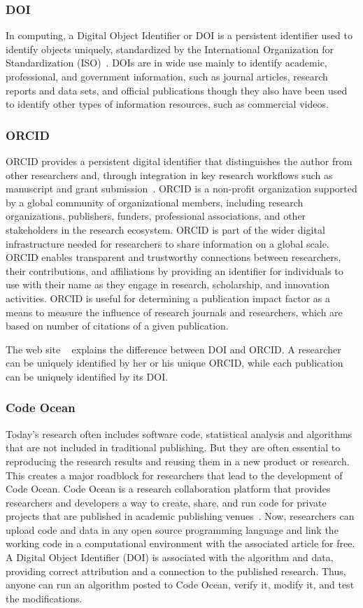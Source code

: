\subsubsection{DOI}
In computing, a Digital Object Identifier or DOI is a persistent identifier used to identify objects uniquely, standardized by the International Organization for Standardization (ISO)~\cite{ISO26324}.  DOIs are in wide use mainly to identify academic, professional, and government information, such as journal articles, research reports and data sets, and official publications though they also have been used to identify other types of information resources, such as commercial videos.

\subsubsection{ORCID}
ORCID provides a persistent digital identifier that distinguishes the author from other researchers and, through integration in key research workflows such as manuscript and grant submission~\cite{ocrcid}. ORCID is a non-profit organization supported by a global community of organizational members, including research organizations, publishers, funders, professional associations, and other stakeholders in the research ecosystem. ORCID is part of the wider digital infrastructure needed for researchers to share information on a global scale. ORCID enables transparent and trustworthy connections between researchers, their contributions, and affiliations by providing an identifier for individuals to use with their name as they engage in research, scholarship, and innovation activities. ORCID is useful for determining a publication impact factor as a means to measure the influence of research journals and researchers, which are based on number of citations of a given publication.
 
The web site ~\cite{YateendraJoshi} explains the difference between DOI and ORCID. A researcher can be uniquely identified by her or his unique ORCID, while each publication can be uniquely identified by its DOI.

\subsubsection{Code Ocean}
Today's research often includes software code, statistical analysis and algorithms that are not included in traditional publishing. But they are often essential to reproducing the research results and reusing them in a new product or research. This creates a major roadblock for researchers that lead to the development of Code Ocean.  Code Ocean is a research collaboration platform that provides researchers and developers a way to create, share, and run code for private projects that are published in academic publishing venues~\cite{codeocean}. Now, researchers can upload code and data in any open source programming language and link the working code in a computational environment with the associated article for free. A Digital Object Identifier (DOI) is associated with the algorithm and data, providing correct attribution and a connection to the published research. Thus, anyone can run an algorithm posted to Code Ocean, verify it, modify it, and test the modifications.

